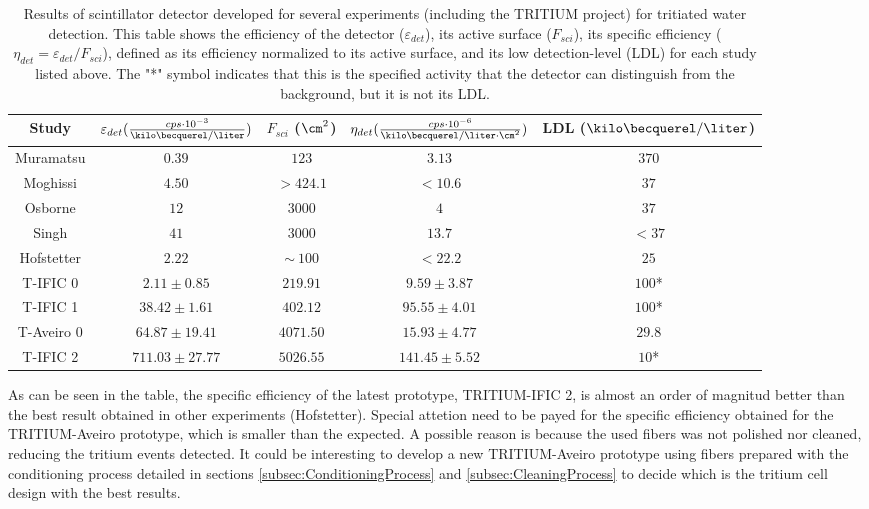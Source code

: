 \begin{table}[htbp]
\begin{center}
\begin{tabular}{|c|c|c|c|c|}
\hline
Study & \parbox{5.5em}{\centering $\varepsilon_{det}(\frac{cps \cdot{} 10^{-3}}{\kilo\becquerel/\liter})$}  & \parbox{4.5em}{\centering $F_{sci}$ ($\cm^2$)}  & \parbox{6.5em}{\centering $\eta_{det}(\frac{cps \cdot{} 10^{-6}}{\kilo\becquerel/ \liter \cdot{} \cm^2})$} & LDL ($\kilo\becquerel / \liter$)\\
\hline \hline \hline
Muramatsu & $0.39$ & $123$ & $3.13$ & $370$ \\ \hline
Moghissi & $4.50$ & $>424.1$ & $<10.6$ & $37$ \\\hline
Osborne & $12$ & $3000$ & $4$ & $37$ \\ \hline
Singh & $41$ & $3000$ & $13.7$ & $<37$ \\ \hline
Hofstetter & $2.22$ & $\sim~100$ & $<22.2$ & $25$ \\ \hline
T-IFIC 0 & $2.11 \pm 0.85$ & $219.91$ & $9.59 \pm 3.87$ & $100$* \\ \hline
T-IFIC 1 & $38.42 \pm 1.61$ & $402.12$ & $95.55 \pm 4.01$ & $100$* \\ \hline
T-Aveiro 0 & $64.87 \pm 19.41$ & $4071.50$ & $15.93 \pm 4.77$ & $29.8$ \\ \hline
T-IFIC 2 & $711.03 \pm 27.77$ & $5026.55$ & $141.45 \pm 5.52$ & $10$* \\ \hline
\end{tabular}
\caption{Results of scintillator detector developed for several experiments (including the TRITIUM project) for tritiated water detection. This table shows the efficiency of the detector ($\varepsilon_{det}$), its active surface ($F_{sci}$), its specific efficiency ($\eta_{det}=\varepsilon_{det}/F_{sci}$), defined as its efficiency normalized to its active surface, and its low detection-level (LDL) for each study listed above. The "*" symbol indicates that this is the specified activity that the detector can distinguish from the background, but it is not its LDL.}
\label{tab:ComparisonResultsTri}
\end{center}
\end{table}

As can be seen in the table, the specific efficiency of the latest prototype, TRITIUM-IFIC 2, is almost an order of magnitud better than the best result obtained in other experiments (Hofstetter). Special attetion need to be payed for the specific efficiency obtained for the TRITIUM-Aveiro prototype, which is smaller than the expected. A possible reason is because the used fibers was not polished nor cleaned, reducing the tritium events detected. It could be interesting to develop a new TRITIUM-Aveiro prototype using fibers prepared with the conditioning process detailed in sections \ref{subsec:ConditioningProcess} and \ref{subsec:CleaningProcess} to decide which is the tritium cell design with the best results. 

